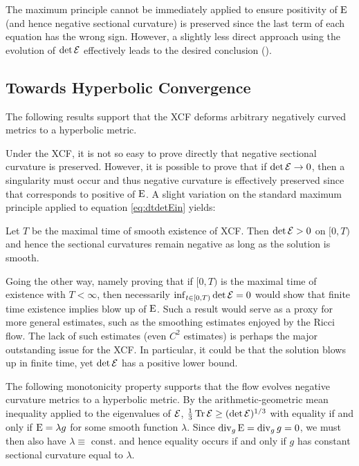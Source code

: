 \documentclass[a4paper,12pt]{amsart}
\begin{document}
The maximum principle cannot be immediately applied to ensure positivity of \(\operatorname{E}\) (and hence negative sectional curvature) is preserved since the last term of each equation has the wrong sign. However, a slightly less direct approach using the evolution of \(\det \operatorname{\mathcal{E}}\) effectively leads to the desired conclusion ().

\subsection{Towards Hyperbolic Convergence}
\label{subsec:xcf_hyperbolic_convergence}

The following results support  that the XCF deforms arbitrary negatively curved metrics to a hyperbolic metric.

Under the XCF, it is not so easy to prove directly that negative sectional curvature is preserved. However, it is possible to prove that if \(\det \operatorname{\mathcal{E}} \to 0\), then a singularity must occur and thus negative curvature is effectively preserved since that corresponds to positive of \(\operatorname{E}\). A slight variation on the standard maximum principle applied to equation \eqref{eq:dtdetEin} yields:

\begin{prop}[{\cite[p. 8]{MR2055396}}]
\label{prop:negative_perserved}

Let $T$ be the maximal time of smooth existence of XCF. Then \(\det \operatorname{\mathcal{E}} > 0\) on \([0, T)\) and hence the sectional curvatures remain negative as long as the solution is smooth.
\end{prop}

Going the other way, namely proving that if \([0, T)\) is the maximal time of existence with \(T < \infty\), then necessarily \(\inf_{t \in [0, T)} \det \operatorname{\mathcal{E}} = 0\) would show that finite time existence implies blow up of \(\operatorname{E}\). Such a result would serve as a proxy for more general estimates, such as the smoothing estimates enjoyed by the Ricci flow. The lack of such estimates (even \(C^2\) estimates) is perhaps the major outstanding issue for the XCF. In particular, it could be that the solution blows up in finite time, yet \(\det \operatorname{\mathcal{E}}\) has a positive lower bound.

The following monotonicity property supports  that the flow evolves negative curvature metrics to a hyperbolic metric. By the arithmetic-geometric mean inequality applied to the eigenvalues of \(\operatorname{\mathcal{E}}\), \(\tfrac{1}{3} \operatorname{Tr}\operatorname{\mathcal{E}} \geq (\det \operatorname{\mathcal{E}})^{1/3}\) with equality if and only if \(\operatorname{E} = \lambda g\) for some smooth function \(\lambda\). Since \(\operatorname{div}_g \operatorname{E} = \operatorname{div}_g g = 0\), we must then also have \(\lambda \equiv \text{ const.}\) and hence equality occurs if and only if \(g\) has constant sectional curvature equal to \(\lambda\).
\end{document}
